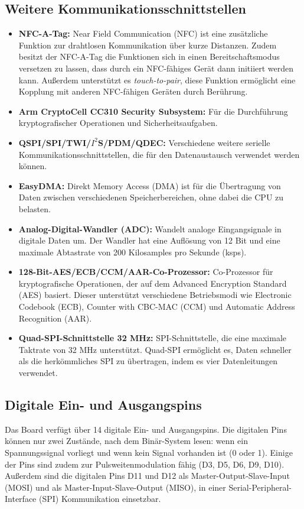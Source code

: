 \subsection{Weitere Kommunikationsschnittstellen}
\cite{Ard.2024}
\begin{itemize}
	\item \textbf{NFC-A-Tag:} Near Field Communication (NFC) ist eine zusätzliche Funktion zur drahtlosen Kommunikation über kurze Distanzen. Zudem besitzt der NFC-A-Tag die Funktionen sich in einen Bereitschaftsmodus versetzen zu lassen, dass durch ein NFC-fähiges Gerät dann initiiert werden kann. Außerdem unterstützt es \textit{touch-to-pair}, diese Funktion ermöglicht eine Kopplung mit anderen NFC-fähigen Geräten durch Berührung.
	\item \textbf{Arm CryptoCell CC310 Security Subsystem:} Für die Durchführung kryptografischer Operationen und Sicherheitsaufgaben.\\ \cite{NrdSem.2024}
	\item \textbf{QSPI/SPI/TWI/$I^2$S/PDM/QDEC:} Verschiedene weitere serielle Kommunikationsschnittstellen, die für den Datenaustausch verwendet werden können.
	\item \textbf{EasyDMA:} Direkt Memory Access (DMA) ist für die Übertragung von Daten zwischen verschiedenen Speicherbereichen, ohne dabei die CPU zu belasten.\cite{Gehrke.2022}
	\item \textbf{Analog-Digital-Wandler (ADC):} Wandelt analoge Eingangsignale in digitale Daten um. Der Wandler hat eine Auflösung von 12 Bit und eine maximale Abtastrate von 200 Kilosamples pro Sekunde (ksps).
	\item \textbf{128-Bit-AES/ECB/CCM/AAR-Co-Prozessor:} Co-Prozessor für kryptografische Operationen, der auf dem Advanced Encryption Standard (AES) basiert. Dieser unterstützt verschiedene Betriebsmodi wie Electronic Codebook (ECB), Counter with CBC-MAC (CCM) und Automatic Address Recognition (AAR). \cite{NrdSem2.2024}
	\item \textbf{Quad-SPI-Schnittstelle 32 MHz:} SPI-Schnittstelle, die eine maximale Taktrate von 32 MHz unterstützt. Quad-SPI ermöglicht es, Daten schneller als die herkömmliches SPI zu übertragen, indem es vier Datenleitungen verwendet.\cite{NrdSem3.2023}
\end{itemize}

\subsection{Digitale Ein- und Ausgangspins}
Das Board verfügt über 14 digitale Ein- und Ausgangspins. Die digitalen Pins können nur zwei Zustände, nach dem Binär-System lesen: wenn ein Spannungssignal vorliegt und wenn kein Signal vorhanden ist (0 oder 1). Einige der Pins sind zudem zur Pulsweitenmodulation fähig (D3, D5, D6, D9, D10). Außerdem sind die digitalen Pins D11 und D12 als Master-Output-Slave-Input (MOSI) und als Master-Input-Slave-Output (MISO), in einer Serial-Peripheral-Interface (SPI) Kommunikation einsetzbar.\cite{Ard.2024}

